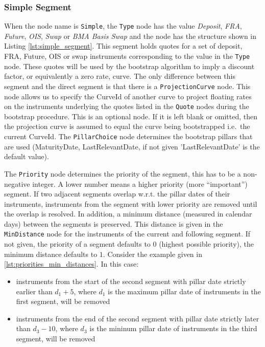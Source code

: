 \subsubsection*{Simple Segment}
When the node name is \lstinline!Simple!, the \lstinline!Type! node has the value \emph{Deposit}, \emph{FRA},
\emph{Future}, \emph{OIS}, \emph{Swap} or \emph{BMA Basis Swap} and the node has the structure shown in Listing
\ref{lst:simple_segment}. This segment holds quotes for a set of deposit, FRA, Future, OIS or swap instruments
corresponding to the value in the \lstinline!Type! node. These quotes will be used by the bootstrap algorithm to imply a
discount factor, or equivalently a zero rate, curve. The only difference between this segment and the direct segment is
that there is a \lstinline!ProjectionCurve! node. This node allows us to specify the CurveId of another curve to project
floating rates on the instruments underlying the quotes listed in the \lstinline!Quote! nodes during the bootstrap
procedure. This is an optional node. If it is left blank or omitted, then the projection curve is assumed to equal the
curve being bootstrapped i.e.\ the current CurveId. The \lstinline!PillarChoice! node determines the bootstrap pillars
that are used (MaturityDate, LastRelevantDate, if not given 'LastRelevantDate' is the default value).

The \lstinline!Priority! node determines the priority of the segment, this has to be a non-negative integer. A lower
number means a higher priority (more ``important'') segment. If two adjacent segments overlap w.r.t. the pillar dates of
their instruments, instruments from the segment with lower priority are removed until the overlap is resolved. In
addition, a minimum distance (measured in calendar days) between the segments is preserved. This distance is given in
the \lstinline!MinDistance! node for the instruments of the current and following segment. If not given, the priority of
a segment defaults to 0 (highest possible priority), the minimum distance defaults to $1$. Consider the example given in
\ref{lst:priorities_min_distances}. In this case:
\begin{itemize}
\item instruments from the start of the second segment with pillar date strictly earlier than $d_1 + 5$, where $d_1$ is
  the maximum pillar date of instruments in the first segment, will be removed
\item instruments from the end of the second segment with pillar date strictly later than $d_3 - 10$, where $d_3$ is the
  mininum pillar date of instruments in the third segment, will be removed
\end{itemize}


